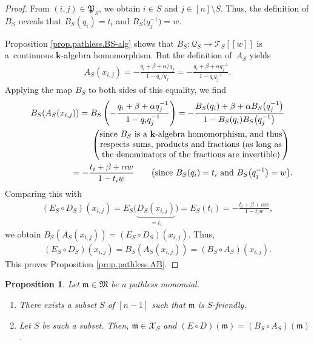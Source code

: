 \documentclass[11pt]{article}
\newtheorem{Proposition}[Theorem]{Proposition}
\numberwithin{equation}{section}
\begin{document}
\begin{proof}From $(i,j) \in\mathfrak{P}_{S}$, we obtain $i\in S$ and $j\in[n] \setminus S$. Thus, the definition of $B_{S}$ reveals that $B_{S} ( q_{i} ) =t_{i}$ and $B_{S}\big( q_{j}^{-1}\big) =w$.

Proposition \ref{prop.pathless.BS-alg} shows that $B_{S}\colon \mathcal{Q}_{S}\rightarrow\mathcal{T}_{S}[[w]] $ is a~continuous $\mathbf{k}$-algebra homomorphism. But the definition of~$A_{S}$ yields
\begin{gather*}
A_{S}(x_{i,j}) =-\frac{q_{i}+\beta+\alpha/q_{j}}{1-q_{i}/q_{j}}=-\frac{q_{i}+\beta+\alpha q_{j}^{-1}}{1-q_{i}q_{j}^{-1}}.
\end{gather*}
Applying the map $B_{S}$ to both sides of this equality, we find
\begin{gather*}
B_{S} ( A_{S}(x_{i,j}) ) =B_{S}\left( -\frac{q_{i}+\beta+\alpha q_{j}^{-1}}{1-q_{i}q_{j}^{-1}}\right)=-\frac{B_{S} ( q_{i} ) +\beta+\alpha B_{S} \big( q_{j}
^{-1}\big) }{1-B_{S}(q_{i}) B_{S}\big( q_{j}^{-1}\big)}\\
\hphantom{B_{S} ( A_{S}(x_{i,j}) )}{} \qquad \left(
\begin{matrix}
\text{since }B_{S}\text{ is a }\mathbf{k}\text{-algebra homomorphism, and
thus}\\
\text{respects sums, products and fractions (as long as}\\
\text{the denominators of the fractions are invertible)}%
\end{matrix}
\right) \\
\hphantom{B_{S} ( A_{S}(x_{i,j}) )}{} =-\frac{t_{i}+\beta+\alpha w}{1-t_{i}w}\qquad \big(\text{since }B_{S}(q_{i}) =t_{i}\text{ and }B_{S}\big(q_{j}^{-1}\big) =w\big) .
\end{gather*}
Comparing this with
\begin{gather*}
( E_{S}\circ D_{S}) (x_{i,j}) =E_{S}\Big(\underbrace{D_{S}(x_{i,j}) }_{=t_{i}}\Big) =E_{S} (t_{i}) =-\frac{t_{i}+\beta+\alpha w}{1-t_{i}w},
\end{gather*}
we obtain $B_{S} ( A_{S}(x_{i,j}) ) = ( E_{S}\circ D_{S}) (x_{i,j}) $. Thus,
\begin{gather*}
( E_{S}\circ D_{S} ) (x_{i,j}) =B_{S} ( A_{S} ( x_{i,j} ) ) = ( B_{S}\circ A_{S} ) (x_{i,j} ) .
\end{gather*}
This proves Proposition \ref{prop.pathless.AB}.
\end{proof}

\begin{Proposition}\label{prop.pathless.S}Let $\mathfrak{m}\in\mathfrak{M}$ be a pathless monomial.
\begin{enumerate}\itemsep=0pt
\item[{\rm (a)}] There exists a subset $S$ of $[n-1] $ such that $\mathfrak{m}$ is $S$-friendly.
\item[{\rm (b)}] Let $S$ be such a subset. Then, $\mathfrak{m}\in\mathcal{X}_{S}$ and $(E\circ D) (\mathfrak{m}) = ( B_{S}\circ A_{S}) (\mathfrak{m}) $.
\end{enumerate}
\end{Proposition}
\end{document}
